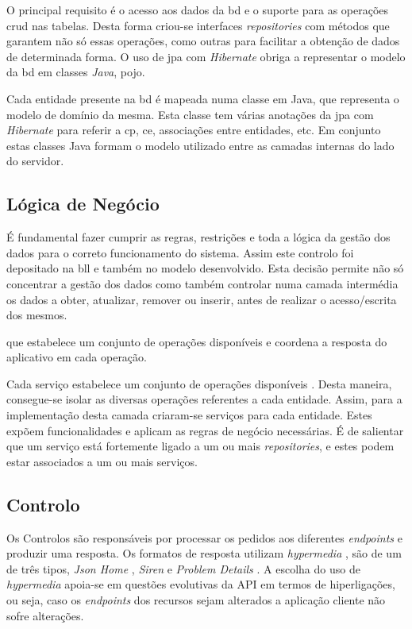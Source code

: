 O principal requisito é o acesso aos dados da \acrshort{bd} e o suporte para as operações \acrshort{crud} nas tabelas. Desta forma criou-se interfaces \textit{repositories} com métodos que garantem não só essas operações, como outras para facilitar a obtenção de dados de determinada forma. O uso de \acrshort{jpa} com \textit{Hibernate} obriga a representar o modelo da \acrshort{bd} em classes \textit{Java}, \acrfull{pojo}.

Cada entidade presente na \acrshort{bd} é mapeada numa classe em Java, que representa o modelo de domínio da mesma. Esta classe tem várias anotações da \acrshort{jpa} com \textit{Hibernate} para referir a \acrlong{cp}, \acrlong{ce}, associações entre entidades, etc. Em conjunto estas classes Java formam o modelo utilizado entre as camadas internas do lado do servidor.

%
%
\subsection{Lógica de Negócio}\label{subsec322}

É fundamental fazer cumprir as regras, restrições e toda a lógica da gestão dos dados para o correto funcionamento do sistema. Assim  este controlo foi depositado na \acrfull{bll} e também no modelo desenvolvido. Esta decisão permite não só concentrar a gestão dos dados como também controlar numa camada intermédia os dados a obter, atualizar, remover ou inserir, antes de realizar o acesso/escrita dos mesmos. 

que estabelece um conjunto de operações disponíveis e coordena a resposta do aplicativo em cada operação.

Cada serviço estabelece um conjunto de operações disponíveis \cite{PofEAASe2:serviceLayer}. Desta maneira, consegue-se isolar as diversas operações referentes a cada entidade. Assim, para a implementação desta camada criaram-se serviços para cada entidade. Estes expõem funcionalidades e aplicam as regras de negócio necessárias. É de salientar que um serviço está fortemente ligado a um ou mais \textit{repositories}, e estes podem estar associados a um ou mais serviços.

%
%
\subsection{Controlo}\label{subsec323}

Os Controlos são responsáveis por processar os pedidos aos diferentes \textit{endpoints} e produzir uma resposta. Os formatos de resposta utilizam \textit{hypermedia} \cite{APIBestP87:hypermedia}, são de um de três tipos, \textit{Json Home} \cite{draftnot72:jsonHome}, \textit{Siren} \cite{kevinswiber:siren} e \textit{Problem Details} \cite{RFC7807:problemDetails}. A escolha do uso de \textit{hypermedia} apoia-se em questões evolutivas da API em termos de hiperligações, ou seja, caso os \textit{endpoints} dos recursos sejam alterados a aplicação cliente não sofre alterações.

